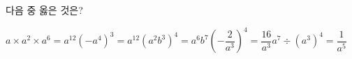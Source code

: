 다음 중 옳은 것은? 
\begin{choicesv}{$a\times a^2\times a^6=a^{12}$}{$(-a^4)^3=a^{12}$}{$(a^2b^3)^4=a^6b^7$}{$\left(-\dfrac{2}{a^3}\right)^4=\dfrac{16}{a^3}$}{$a^7\div(a^3)^4=\dfrac{1}{a^5}$}\end{choicesv}
